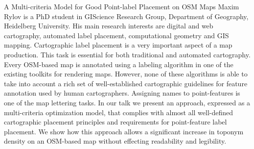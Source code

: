 %
{A Multi-criteria Model for Good Point-label Placement on OSM Maps}%
{Maxim Rylov is a PhD student in GIScience Research Group, Department of Geography, Heidelberg University. His main research interests are digital and web cartography, automated label placement, computational geometry and GIS mapping.}%
{Cartographic label placement is a very important aspect of a map production. This task is essential for both traditional and automated cartography. Every OSM-based map is annotated using a labeling algorithm in one of the existing toolkits for rendering maps. However, none of these algorithms is able to take into account a rich set of well-established cartographic guidelines for feature annotation used by human cartographers. Assigning names to point-features is one of the map lettering tasks. In our talk we present an approach, expressed as a multi-criteria optimization model, that complies with almost all well-defined cartographic placement principles and requirements for point-feature label placement. We show how this approach allows a significant increase in toponym density on an OSM-based map without effecting readability and legibility.}

